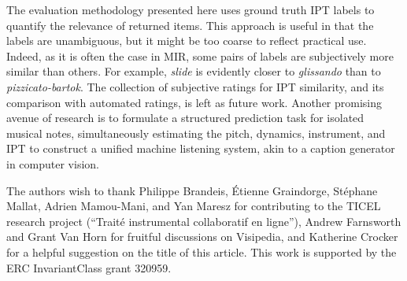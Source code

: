 The evaluation methodology presented here uses ground truth IPT labels to quantify the relevance of returned items.
This approach is useful in that the labels are unambiguous, but it might be too coarse to reflect practical use.
Indeed, as it is often the case in MIR, some pairs of labels are subjectively more similar than others.
For example, \emph{slide} is evidently closer to \emph{glissando} than to \emph{pizzicato-bartok}.
The collection of subjective ratings for IPT similarity, and its comparison with automated ratings, is left as future work.
Another promising avenue of research is to formulate a structured prediction task for isolated musical notes, simultaneously estimating the pitch, dynamics, instrument, and IPT to construct a unified machine listening system, akin to a caption generator in computer vision.



\begin{acks}
The authors wish to thank Philippe Brandeis, \'{E}tienne Graindorge, St\'{e}phane Mallat, Adrien Mamou-Mani, and Yan Maresz for contributing to the TICEL research project
(``Trait\'{e} instrumental collaboratif en ligne''),
Andrew Farnsworth and Grant Van Horn for fruitful discussions on Visipedia,
and Katherine Crocker for a helpful suggestion on the title of this article.
This work is supported by the ERC InvariantClass grant 320959.
\end{acks}

